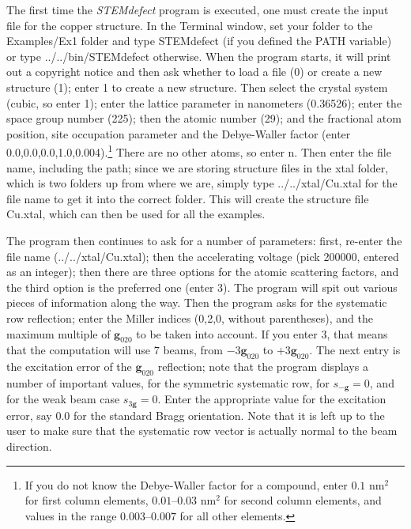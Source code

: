 \documentclass[11pt]{article}
\begin{document}
The first time the \textit{STEMdefect} program is executed, one must create the input file for the copper structure. In the Terminal window, 
set your folder to the \textsf{Examples/Ex1} folder and type
\textsf{STEMdefect} (if you defined the PATH variable) or type \textsf{../../bin/STEMdefect} otherwise.  When the program starts, it will print
out a copyright notice and then ask whether to load a file (0) or create a new structure (1); enter \textsf{1} to create a new structure. Then select the 
crystal system (cubic, so enter \textsf{1}); enter the lattice parameter in nanometers (\textsf{0.36526}); enter the space group number (\textsf{225});
then the atomic number (\textsf{29}); and the fractional atom position, site occupation parameter and the Debye-Waller factor (enter \textsf{0.0,0.0,0.0,1.0,0.004}).\footnote{If you
do not know the Debye-Waller factor for a compound, enter $0.1$ nm$^2$ for first column elements, $0.01$--$0.03$ nm$^2$ for second column elements, and 
values in the range $0.003$--$0.007$ for all other elements.}  There are no other atoms, so enter \textsf{n}.  Then enter the file name, including the path; since we
are storing structure files in the \textsf{xtal} folder, which is two folders up from where we are, simply type \textsf{../../xtal/Cu.xtal} for the file name to get it into the correct folder.
This will create the structure file \textsf{Cu.xtal}, which can then be used for all the examples.  

The program then continues to ask for a number of parameters: first, re-enter the file name (\textsf{../../xtal/Cu.xtal}); then the accelerating voltage (pick \textsf{200000}, entered as an integer);
then there are three options for the atomic scattering factors, and the third option is the preferred one (enter \textsf{3}).  The program will spit out various pieces
of information along the way.  Then the program asks for the systematic row reflection; enter the Miller indices (\textsf{0,2,0}, without parentheses), and the maximum
multiple of $\mathbf{g}_{020}$ to be taken into account.  If you enter \textsf{3}, that means that the computation will use $7$ beams, from $-3\mathbf{g}_{020}$ to 
$+3\mathbf{g}_{020}$.  The next entry is the excitation error of the $\mathbf{g}_{020}$ reflection; note that the program displays a number of important values, for
the symmetric systematic row, for $s_{-\mathbf{g}}=0$, and for the weak beam case $s_{3\mathbf{g}}=0$.  Enter the appropriate value for the excitation error, say \textsf{0.0}
for the standard Bragg orientation.  Note that it is left up to the user to make sure that the systematic row vector is actually normal to the beam direction.
\end{document}
